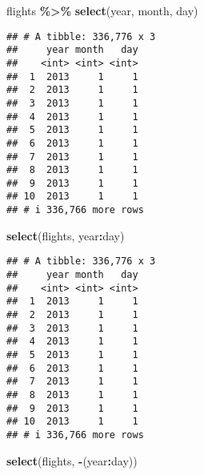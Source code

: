 \documentclass[
]{article}
\newenvironment{Shaded}{\begin{snugshade}}{\end{snugshade}}
\newcommand{\FunctionTok}[1]{\textcolor[rgb]{0.13,0.29,0.53}{\textbf{#1}}}
\newcommand{\NormalTok}[1]{#1}
\newcommand{\SpecialCharTok}[1]{\textcolor[rgb]{0.81,0.36,0.00}{\textbf{#1}}}
\begin{document}
\begin{Shaded}
\begin{Highlighting}[]
\NormalTok{flights }\SpecialCharTok{\%\textgreater{}\%} \FunctionTok{select}\NormalTok{(year, month, day)}
\end{Highlighting}
\end{Shaded}

\begin{verbatim}
## # A tibble: 336,776 x 3
##     year month   day
##    <int> <int> <int>
##  1  2013     1     1
##  2  2013     1     1
##  3  2013     1     1
##  4  2013     1     1
##  5  2013     1     1
##  6  2013     1     1
##  7  2013     1     1
##  8  2013     1     1
##  9  2013     1     1
## 10  2013     1     1
## # i 336,766 more rows
\end{verbatim}

\begin{Shaded}
\begin{Highlighting}[]
\FunctionTok{select}\NormalTok{(flights, year}\SpecialCharTok{:}\NormalTok{day)}
\end{Highlighting}
\end{Shaded}

\begin{verbatim}
## # A tibble: 336,776 x 3
##     year month   day
##    <int> <int> <int>
##  1  2013     1     1
##  2  2013     1     1
##  3  2013     1     1
##  4  2013     1     1
##  5  2013     1     1
##  6  2013     1     1
##  7  2013     1     1
##  8  2013     1     1
##  9  2013     1     1
## 10  2013     1     1
## # i 336,766 more rows
\end{verbatim}

\begin{Shaded}
\begin{Highlighting}[]
\FunctionTok{select}\NormalTok{(flights, }\SpecialCharTok{{-}}\NormalTok{(year}\SpecialCharTok{:}\NormalTok{day))}
\end{Highlighting}
\end{Shaded}
\end{document}
